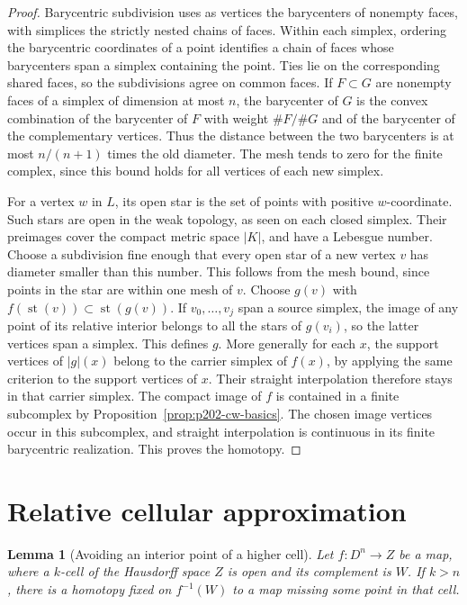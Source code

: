 \documentclass[11pt,oneside,openany]{book}
\theoremstyle{plain}
\newtheorem{lemma}[theorem]{Lemma}
\theoremstyle{definition}
\theoremstyle{remark}
\begin{document}
\begin{proof}
Barycentric subdivision uses as vertices the barycenters
of nonempty faces, with simplices the strictly nested
chains of faces. Within each simplex, ordering the
barycentric coordinates of a point identifies a chain of
faces whose barycenters span a simplex containing the
point. Ties lie on the corresponding shared faces, so the
subdivisions agree on common faces. If \(F\subset G\) are
nonempty faces of a simplex of dimension at most \(n\),
the barycenter of \(G\) is the convex combination of the
barycenter of \(F\) with weight \(\#F/\#G\) and of the
barycenter of the complementary vertices. Thus the
distance between the two barycenters is at most
\(n/(n+1)\) times the old diameter. The mesh tends to
zero for the finite complex, since this bound holds for
all vertices of each new simplex.

For a vertex \(w\) in \(L\), its open star is the set of
points with positive \(w\)-coordinate. Such stars are
open in the weak topology, as seen on each closed
simplex. Their preimages cover the compact metric space
\(|K|\), and have a Lebesgue number. Choose a subdivision
fine enough that every open star of a new vertex \(v\)
has diameter smaller than this number. This follows from
the mesh bound, since points in the star are within one
mesh of \(v\). Choose \(g(v)\) with
\(f(\operatorname{st}(v))\subset\operatorname{st}(g(v))\).
If \(v_0,\ldots,v_j\) span a source simplex, the image of
any point of its relative interior belongs to all the
stars of \(g(v_i)\), so the latter vertices span a
simplex. This defines \(g\). More generally for each
\(x\), the support vertices of \(|g|(x)\) belong to
the carrier simplex of \(f(x)\), by applying the same
criterion to the support vertices of \(x\). Their straight
interpolation therefore stays in that carrier simplex.
The compact image of \(f\) is contained in a finite
subcomplex by Proposition~\ref{prop:p202-cw-basics}.
The chosen image vertices occur in this subcomplex,
and straight interpolation is continuous in its finite
barycentric realization. This proves the homotopy.
\end{proof}


\section{Relative cellular approximation}\label{p202:T12}

\begin{lemma}[Avoiding an interior point of a higher cell]
\label{lem:p202-avoid-cell}
Let \(f:D^n\to Z\) be a map, where a \(k\)-cell of the
Hausdorff space \(Z\) is open and its complement is \(W\).
If \(k>n\), there is a homotopy fixed on \(f^{-1}(W)\)
to a map missing some point in that cell.
\end{lemma}
\end{document}
